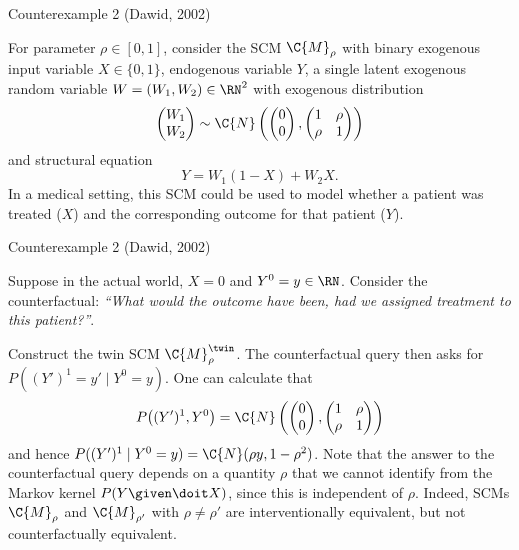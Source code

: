 \begin{frame}{Counterexample 2 (Dawid, 2002)}
\begin{example}[1/2]
  For parameter $\rho\in[0,1]$, consider the SCM $\C{M}_\rho$ with binary exogenous input variable $X \in \{0,1\}$, endogenous variable $Y$, a single latent exogenous random variable $W = (W_1,W_2) \in \RN^2$ with
exogenous distribution 
  $$\begin{pmatrix} W_1 \\ W_2 \end{pmatrix}\sim\C{N}\left(\begin{pmatrix}0 \\ 0\end{pmatrix},\begin{pmatrix}1&\rho\\ \rho&1\end{pmatrix}\right)$$
and structural equation
  $$Y = W_1 (1 - X) + W_2 X.$$
In a medical setting, this SCM could be used to model whether a patient was treated ($X$) and the corresponding outcome for that patient ($Y$).
\end{example}
\end{frame}

\begin{frame}{Counterexample 2 (Dawid, 2002)}
\begin{example}[2/2]
  Suppose in the actual world, $X = 0$ and $Y^0 = y \in \RN$.
  Consider the counterfactual: {\it ``What would the outcome have been, had we assigned treatment to this patient?''}.

  Construct the twin SCM $\C{M}_{\rho}^{\twin}$.
The counterfactual query then asks for $P((Y')^1=y'\mid Y^0=y)$. One can calculate that
$$
  P\big((Y')^1,Y^0\big) = \C{N}\left(\begin{pmatrix}0\\ 0\end{pmatrix}, \begin{pmatrix} 1 & \rho \\ \rho & 1 \end{pmatrix}\right)
$$
and hence $P((Y')^1 \mid Y^0=y) = \C{N}(\rho y,1-\rho^2)$. Note that the answer to the counterfactual query depends on a quantity $\rho$ that we cannot identify from the Markov kernel $P(Y\given \doit X)$, since this is independent of $\rho$. 
Indeed, SCMs $\C{M}_{\rho}$ and $\C{M}_{\rho'}$ with $\rho\neq\rho'$ are interventionally equivalent, but not counterfactually equivalent.
\end{example}
\end{frame}
